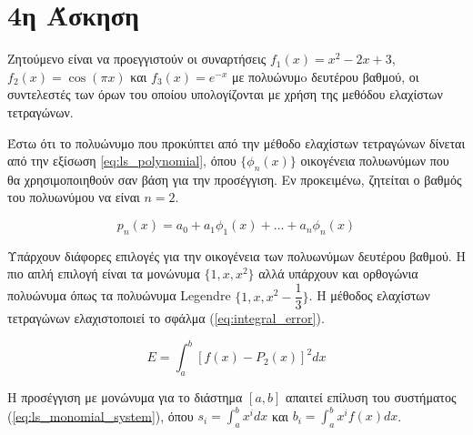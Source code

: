 \documentclass[assignment3.tex]{subfiles}
\begin{document}
\section*{4η Άσκηση}
Ζητούμενο είναι να προεγγιστούν οι συναρτήσεις $f_1(x)=x^2-2x+3$, $f_2(x)=\cos(\pi x)$ και $f_3(x)=e^{-x}$ με πολυώνυμo δευτέρου βαθμού, οι συντελεστές των όρων του οποίου υπολογίζονται με χρήση της μεθόδου ελαχίστων τετραγώνων.

Έστω ότι το πολυώνυμο που προκύπτει από την μέθοδο ελαχίστων τετραγώνων δίνεται από την εξίσωση \ref{eq:ls_polynomial}, όπου $\lbrace\phi_n(x)\rbrace$ οικογένεια πολυωνύμων που θα χρησιμοποιηθούν σαν βάση για την προσέγγιση. Εν προκειμένω, ζητείται ο βαθμός του πολυωνύμου να είναι $n=2$.

\begin{equation}
p_n(x) = a_0 + a_1 \phi_1(x) + \dots + a_n \phi_n(x)
\label{eq:ls_polynomial}
\end{equation}

Υπάρχουν διάφορες επιλογές για την οικογένεια των πολυωνύμων δευτέρου βαθμού. Η πιο απλή επιλογή είναι τα μονώνυμα $\lbrace1, x, x^2\rbrace$ αλλά υπάρχουν και ορθογώνια πολυώνυμα όπως τα πολυώνυμα \textlatin{Legendre} $\lbrace1, x, x^2-\dfrac{1}{3}\rbrace$. Η μέθοδος ελαχίστων τετραγώνων ελαχιστοποιεί το σφάλμα (\ref{eq:integral_error}).

\begin{equation}
E=\int_{a}^{b} \left[f(x)-P_2(x)\right]^2dx
\label{eq:integral_error}
\end{equation}

Η προσέγγιση με μονώνυμα για το διάστημα $[a,b]$ απαιτεί επίλυση του συστήματος (\ref{eq:ls_monomial_system}), όπου $s_i=\int_{a}^{b}x^idx$ και $b_i=\int_{a}^{b}x^i f(x)dx$. 
\end{document}
